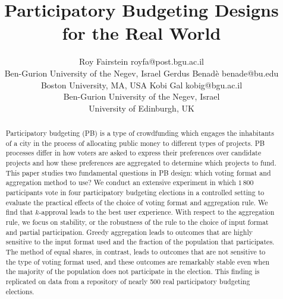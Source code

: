 \documentclass[twoside,11pt]{article}
\begin{document}
\title{Participatory Budgeting  Designs for the Real World}

\author{\name Roy Fairstein \email royfa@post.bgu.ac.il \\
       \addr  Ben-Gurion University of the Negev, Israel
       \AND
       \name Gerdus Benad\`{e} \email benade@bu.edu \\
       \addr Boston University, MA, USA
       \AND
       \name Kobi Gal \email kobig@bgu.ac.il \\
       \addr Ben-Gurion University of the Negev, Israel \\
       University of Edinburgh, UK }


\maketitle


\begin{abstract}
  Participatory budgeting (PB) is a type of crowdfunding which engages the inhabitants of a city  in the process of allocating  public money to different types of projects. 
  PB processes  differ in how voters are asked to express their preferences over candidate projects and how these preferences are aggregated to determine which projects to fund. 
  This paper studies  two fundamental questions in PB design: which voting format and aggregation method to use?
  We conduct an extensive experiment in which $1\,800$ participants vote in four participatory budgeting elections in a controlled setting to evaluate the practical effects of the choice of voting format and aggregation rule. 
    We find  that $k$-approval leads to the best user experience. 
    With respect to the aggregation rule, we focus on stability, or the robustness of the rule to the choice of input format and partial participation. Greedy aggregation leads to outcomes that are  highly sensitive to   the input format used and the fraction of the population that participates. The method of equal shares, in contrast, leads to outcomes that are not sensitive to the type of voting format used, and these outcomes are remarkably stable even when the majority of the population does not participate in the election.  This finding is  replicated on data from a repository of nearly 500 real participatory budgeting elections. 
\end{abstract}


\end{document}
